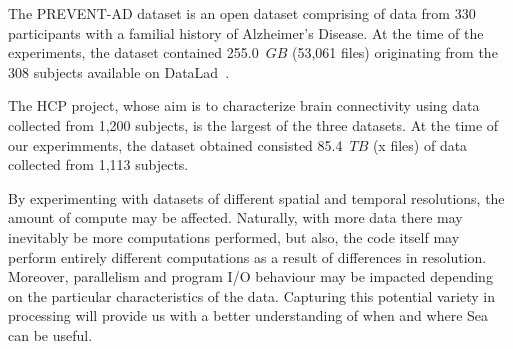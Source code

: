     
    The PREVENT-AD dataset is an open dataset comprising of data from 330 participants with a familial history
    of Alzheimer's Disease.
    At the time of the experiments, the dataset contained 255.0~$GB$ (53,061 files) originating from the 308 subjects available on DataLad~\cite{}.
    
    The HCP project, whose aim is to characterize brain connectivity using data collected from 1,200 subjects, is the largest of the three datasets.
    At the time of our experimments, the dataset obtained consisted 85.4~$TB$ (x files) of data collected from 1,113 subjects.
    
    By experimenting with datasets of different spatial and temporal resolutions, the amount of compute may be affected.
    Naturally, with more data there may inevitably be more computations performed, but also, the code itself may
    perform entirely different computations as a result of differences in resolution. Moreover, parallelism and program I/O behaviour
    may be impacted depending on the particular characteristics of the data. Capturing this potential
    variety in processing will provide us with a better understanding of when and where Sea can be useful.
    
    \begin{table}[t]
      \small\centering
    \caption{Dataset characteristics }\label{table:data}
    \end{table}
    
